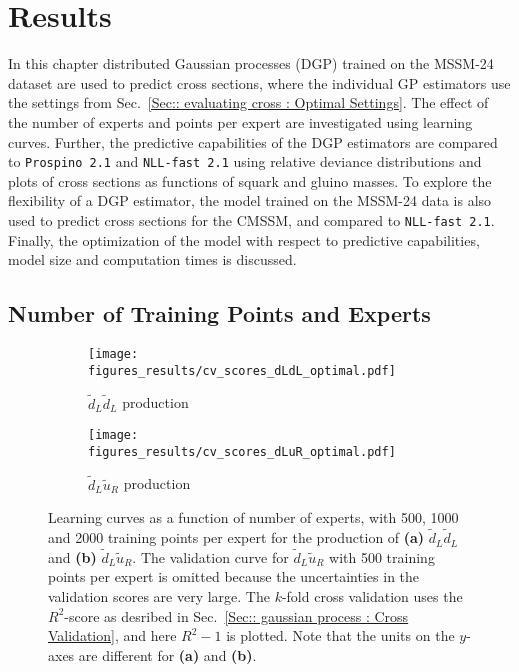 \documentclass[twoside,english]{uiofysmaster}
\begin{document}
{{\chapter{Results}\label{Chapter:Results}

In this chapter distributed Gaussian processes (DGP) trained on the MSSM-24 dataset are used to predict cross sections, where the individual GP estimators use the settings from Sec.~\ref{Sec:: evaluating cross : Optimal Settings}. The effect of the number of experts and points per expert are investigated using learning curves. Further, the predictive capabilities of the DGP estimators are compared to \verb|Prospino 2.1| and \verb|NLL-fast 2.1| using relative deviance distributions and plots of cross sections as functions of squark and gluino masses. To explore the flexibility of a DGP estimator, the model trained on the MSSM-24 data is also used to predict cross sections for the CMSSM, and compared to \verb|NLL-fast 2.1|. Finally, the optimization of the model with respect to predictive capabilities, model size and computation times is discussed.

\section{Number of Training Points and Experts}

\begin{figure}
    \centering
    \begin{subfigure}[b]{0.9\textwidth}
        \texttt{[image: figures\_results/cv\_scores\_dLdL\_optimal.pdf]}
        \caption{$\widetilde{d}_L \widetilde{d}_L$ production}
        \label{Fig:: results : Learning curves dLdL}
    \end{subfigure}
    \begin{subfigure}[b]{0.9\textwidth}
        \texttt{[image: figures\_results/cv\_scores\_dLuR\_optimal.pdf]}
        \caption{$\widetilde{d}_L \widetilde{u}_R$ production}
        \label{Fig :: results : Learning curves dLuL}
    \end{subfigure}
    \caption{Learning curves as a function of number of experts, with 500, 1000 and 2000 training points per expert for the production of \textbf{(a)} $\widetilde{d}_L \widetilde{d}_L$ and \textbf{(b)} $\widetilde{d}_L\widetilde{u}_R$. The validation curve for $\widetilde{d}_L \widetilde{u}_R$ with 500 training points per expert is omitted because the uncertainties in the validation scores are very large. The $k$-fold cross validation uses the $R^2$-score as desribed in Sec.~\ref{Sec:: gaussian process : Cross Validation}, and here $R^2-1$ is plotted. Note that the units on the $y$-axes are different for \textbf{(a)} and \textbf{(b)}.}
\label{Fig:: results : Learning curves}
\end{figure}

}}
\end{document}
